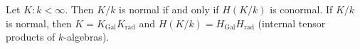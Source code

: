 Let $K:k < \infty$. Then $K/k$ is normal if and only if $H(K/k)$ is conormal. If $K/k$ is normal, then $K = K_{\text{Gal}}K_{\text{rad}}$ and $H(K/k) = H_{\text{Gal}}H_{\text{rad}}$ (internal tensor products of $k$-algebras).
